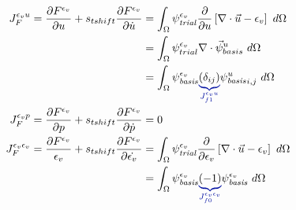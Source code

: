 \begin{align}
    J_F^{\epsilon_{v} u} = \frac{\partial F^{\epsilon_{v}}} {\partial u} + s_{tshift} \frac{\partial F^{\epsilon_{v}}}{\partial \dot{u}}                       & =
    \int_{\Omega} \trialscalar[\epsilon_{v}] \frac{\partial}{\partial u} \left[ \nabla \cdot \vec{u} - \epsilon_{v} \right] \ d\Omega                                                                                                                                                                             \\
                                                                                                                                                               & = \int_{\Omega} \psi_{trial}^{\epsilon_{v}} \nabla \cdot \vec{\psi}_{basis}^u \ d\Omega                                                          \\
                                                                                                                                                               & = \int_{\Omega}
    \basisscalar[\epsilon_{v}] \eqnannotate{\left(\delta_{ij}\right)}{J_{f1}^{\epsilon_{v}u}}
    \basisscalar[u]_{i,j} \ d\Omega                                                                                                                                                                                                                                                                               \\
    J_F^{\epsilon_{v} p} = \frac{\partial F^{\epsilon_{v}}}{\partial p} + s_{tshift} \frac{\partial F^{\epsilon_{v}}}{\partial \dot{p}}                        & = 0                                                                                                                                              \\
    J_F^{\epsilon_{v}\epsilon_{v}} = \frac{\partial F^{\epsilon_{v}}}{\epsilon_{v}} + s_{tshift} \frac{\partial F^{\epsilon_{v}}}{\partial \dot{\epsilon_{v}}} & =
    \int_{\Omega} \trialscalar[\epsilon_{v}] \frac{\partial}{\partial \epsilon_{v}} \left[ \nabla \cdot \vec{u} - \epsilon_{v} \right] \ d\Omega                                                                                                                                                                  \\
                                                                                                                                                               & = \int_{\Omega} \basisscalar[\epsilon_{v}] \eqnannotate{\left(-1\right)}{J_{f0}^{\epsilon_{v}\epsilon_{v}}} \basisscalar[\epsilon_{v}] \ d\Omega \\

\end{align}

